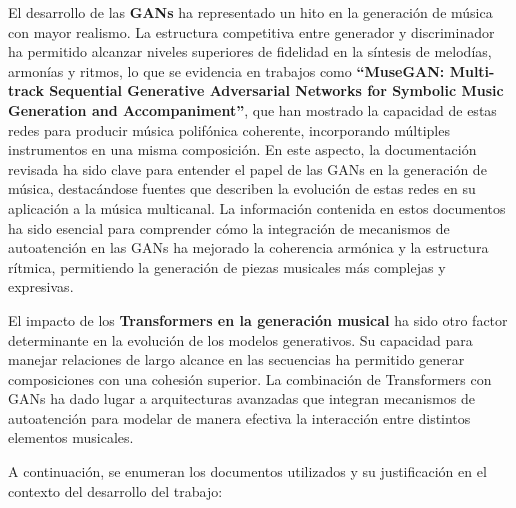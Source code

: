 El desarrollo de las \textbf{GANs} ha representado un hito en la generación de música con mayor realismo. La estructura competitiva entre generador y discriminador ha permitido alcanzar niveles superiores de fidelidad en la síntesis de melodías, armonías y ritmos, lo que se evidencia en trabajos como \textbf{``MuseGAN: Multi-track Sequential Generative Adversarial Networks for Symbolic Music Generation and Accompaniment''}\citep{dong2018musegan}, que han mostrado la capacidad de estas redes para producir música polifónica coherente, incorporando múltiples instrumentos en una misma composición. En este aspecto, la documentación revisada ha sido clave para entender el papel de las GANs en la generación de música, destacándose fuentes que describen la evolución de estas redes en su aplicación a la música multicanal. La información contenida en estos documentos ha sido esencial para comprender cómo la integración de mecanismos de autoatención en las GANs ha mejorado la coherencia armónica y la estructura rítmica, permitiendo la generación de piezas musicales más complejas y expresivas.

El impacto de los \textbf{Transformers en la generación musical} ha sido otro factor determinante en la evolución de los modelos generativos. Su capacidad para manejar relaciones de largo alcance en las secuencias ha permitido generar composiciones con una cohesión superior. La combinación de Transformers con GANs ha dado lugar a arquitecturas avanzadas que integran mecanismos de autoatención para modelar de manera efectiva la interacción entre distintos elementos musicales.

\newpage
A continuación, se enumeran los documentos utilizados y su justificación en el contexto del desarrollo del trabajo:

